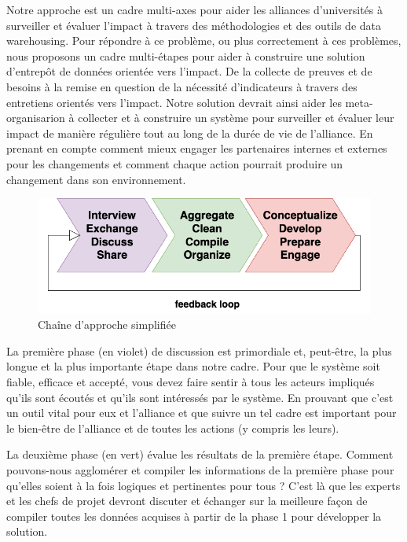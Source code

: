 Notre approche est un cadre multi-axes pour aider les alliances d'universités à surveiller et évaluer l'impact à travers des méthodologies et des outils de data warehousing. Pour répondre à ce problème, ou plus correctement à ces problèmes, nous proposons un cadre multi-étapes pour aider à construire une solution d'entrepôt de données orientée vers l'impact. De la collecte de preuves et de besoins à la remise en question de la nécessité d'indicateurs à travers des entretiens orientés vers l'impact. Notre solution devrait ainsi aider les meta-organisarion à collecter et à construire un système pour surveiller et évaluer leur impact de manière régulière tout au long de la durée de vie de l'alliance. En prenant en compte comment mieux engager les partenaires internes et externes pour les changements et comment chaque action pourrait produire un changement dans son environnement.

\begin{figure}[h]
    \centering
    \includegraphics[width=1\linewidth]{Modele_Latex_CNRIUT2025//images/Diagrams-Simplified framework chain Our approach.drawio.png}
    \caption{Chaîne d'approche simplifiée}
    \label{fig:approach-simplified}
\end{figure}

La première phase (en violet) de discussion est primordiale et, peut-être, la plus longue et la plus importante étape dans notre cadre. Pour que le système soit fiable, efficace et accepté, vous devez faire sentir à tous les acteurs impliqués qu'ils sont écoutés et qu'ils sont intéressés par le système. En prouvant que c'est un outil vital pour eux et l'alliance et que suivre un tel cadre est important pour le bien-être de l'alliance et de toutes les actions (y compris les leurs).

La deuxième phase (en vert) évalue les résultats de la première étape. Comment pouvons-nous agglomérer et compiler les informations de la première phase pour qu'elles soient à la fois logiques et pertinentes pour tous ? C'est là que les experts et les chefs de projet devront discuter et échanger sur la meilleure façon de compiler toutes les données acquises à partir de la phase 1 pour développer la solution.

